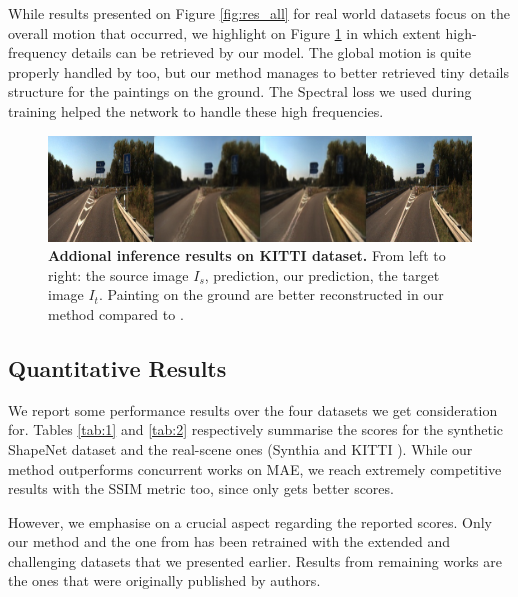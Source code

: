 While results presented on Figure \ref{fig:res_all} for real world datasets focus on the overall motion that occurred, we highlight on Figure \ref{fig:res_all2} in which extent high-frequency details can be retrieved by our model. The global motion is quite properly handled by \citep{kim2020novel} too, but our method manages to better retrieved tiny details structure for the paintings on the ground. The Spectral loss we used during training helped the network to handle these high frequencies. 
\begin{figure}[h!]
    \begin{center}
    \includegraphics[width=\textwidth]{images/epipolarnvs/rebbutal_KITTI_3.jpg}
    \end{center}
     \caption{\textbf{Addional inference results on KITTI dataset.} From left to right: the source image  $I_s$, \citep{kim2020novel} prediction, our prediction, the target image $I_t$. Painting on the ground are better reconstructed in our method compared to \citep{kim2020novel}.}
     \label{fig:res_all2}
\end{figure}

  
\subsection{Quantitative Results}

We report some performance results over the four datasets we get consideration for. Tables \ref{tab:1} and \ref{tab:2} respectively summarise the scores for the synthetic ShapeNet \citep{chang2015shapenet} dataset and the real-scene ones (Synthia \citep{ros2016synthia} and KITTI \citep{geiger2012we}). While our method outperforms concurrent works on MAE, we reach extremely competitive results with the SSIM metric too, since only \citep{sun2018multiview} gets better scores. \newline

However, we emphasise on a crucial aspect regarding the reported scores. Only our method and the one from \citep{kim2020novel} has been retrained with the extended and challenging datasets that we presented earlier. Results from remaining works \citep{tatarchenko2015single,zhou2016view,park2017transformation,sun2018multiview,} are the ones that were originally published by authors. 

